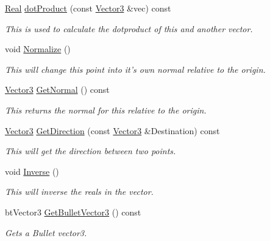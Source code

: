 \begin{DoxyCompactItemize}
\hyperlink{namespacephys_af7eb897198d265b8e868f45240230d5f}{Real} \hyperlink{classphys_1_1Vector3_ac30ef9729b1a4e6001f5f5219a88176d}{dotProduct} (const \hyperlink{classphys_1_1Vector3}{Vector3} \&vec) const 
\begin{DoxyCompactList}\small\item\em This is used to calculate the dotproduct of this and another vector. \item\end{DoxyCompactList}\item 
void \hyperlink{classphys_1_1Vector3_ae39fe0545df88148bcd668b3bd2a4388}{Normalize} ()
\begin{DoxyCompactList}\small\item\em This will change this point into it's own normal relative to the origin. \item\end{DoxyCompactList}\item 
\hyperlink{classphys_1_1Vector3}{Vector3} \hyperlink{classphys_1_1Vector3_a81e11f45378758391c97ec55b519951c}{GetNormal} () const 
\begin{DoxyCompactList}\small\item\em This returns the normal for this relative to the origin. \item\end{DoxyCompactList}\item 
\hyperlink{classphys_1_1Vector3}{Vector3} \hyperlink{classphys_1_1Vector3_a63cd464cdd9ba976ac112fdf8bb620be}{GetDirection} (const \hyperlink{classphys_1_1Vector3}{Vector3} \&Destination) const 
\begin{DoxyCompactList}\small\item\em This will get the direction between two points. \item\end{DoxyCompactList}\item 
void \hyperlink{classphys_1_1Vector3_a30af9c8ae51596fa00fa7f350f9668f5}{Inverse} ()
\begin{DoxyCompactList}\small\item\em This will inverse the reals in the vector. \item\end{DoxyCompactList}\item 
btVector3 \hyperlink{classphys_1_1Vector3_adf4129007ee41f5a03e97502f2df9c41}{GetBulletVector3} () const 
\begin{DoxyCompactList}\small\item\em Gets a Bullet vector3. \item\end{DoxyCompactList}\item 

\end{DoxyCompactItemize}
